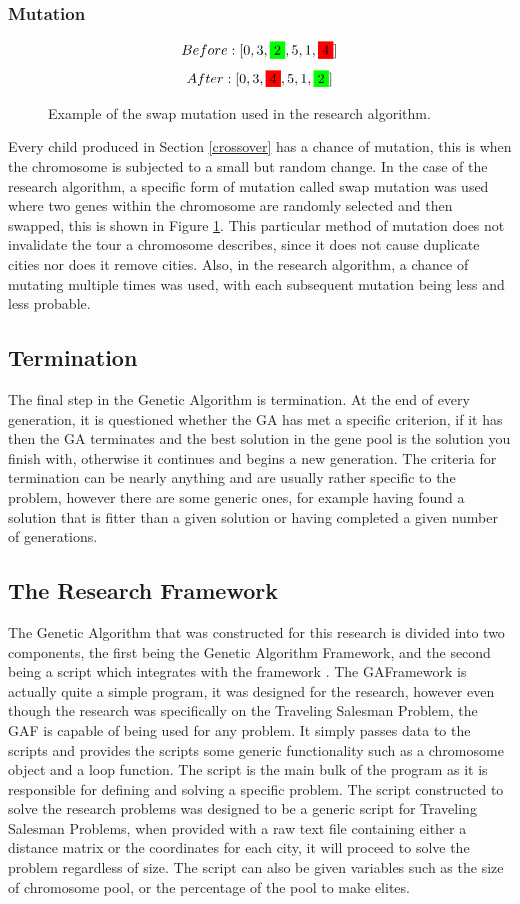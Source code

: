 \subsubsection{Mutation}
\par
\begin{figure}[H]
\[Before: [0,3,\colorbox{green}{2},5,1,\colorbox{red}{4}]\]
\[After: [0,3,\colorbox{red}{4},5,1,\colorbox{green}{2}]\]
\caption{Example of the swap mutation used in the research algorithm. \label{fig:mut}}
\end{figure}
Every child produced in Section \ref{crossover} has a chance of mutation, this is when the chromosome is subjected to a small but random change. In the case of the research algorithm, a specific form of mutation called swap mutation was used where two genes within the chromosome are randomly selected and then swapped, this is shown in Figure \ref{fig:mut}. This particular method of mutation does not invalidate the tour a chromosome describes, since it does not cause duplicate cities nor does it remove cities. Also, in the research algorithm, a chance of mutating multiple times was used, with each subsequent mutation being less and less probable.
\subsection{Termination}
\par
The final step in the Genetic Algorithm is termination. At the end of every generation, it is questioned whether the GA has met a specific criterion, if it has then the GA terminates and the best solution in the gene pool is the solution you finish with, otherwise it continues and begins a new generation. The criteria for termination can be nearly anything and are usually rather specific to the problem, however there are some generic ones, for example having found a solution that is fitter than a given solution or having completed a given number of generations.
\subsection{The Research Framework}
\par
The Genetic Algorithm that was constructed for this research is divided into two components, the first being the Genetic Algorithm Framework, and the second being a script which integrates with the framework \cite{Code}.
The GAFramework is actually quite a simple program, it was designed for the research, however even though the research was specifically on the Traveling Salesman Problem, the GAF is capable of being used for any problem. It simply passes data to the scripts and provides the scripts some generic functionality such as a chromosome object and a loop function.
The script is the main bulk of the program as it is responsible for defining and solving a specific problem. The script constructed to solve the research problems was designed to be a generic script for Traveling Salesman Problems, when provided with a raw text file containing either a distance matrix or the coordinates for each city, it will proceed to solve the problem regardless of size. The script can also be given variables such as the size of chromosome pool, or the percentage of the pool to make elites. 

